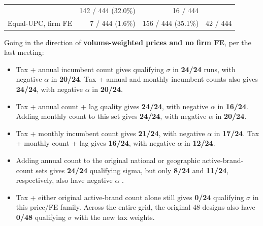 \documentclass[10pt,]{article}
\providecommand{\tightlist}{%
  \setlength{\itemsep}{0pt}\setlength{\parskip}{0pt}}
\begin{document}
\begin{longtable}[]{@{}lrrr@{}}
\begin{minipage}[t]{0.20\columnwidth}
\end{minipage} & \begin{minipage}[t]{0.20\columnwidth}\raggedleft\strut
142 / 444 (32.0\%)\strut
\end{minipage} & \begin{minipage}[t]{0.20\columnwidth}\raggedleft\strut
16 / 444\strut
\end{minipage}\tabularnewline
\begin{minipage}[t]{0.27\columnwidth}\raggedright\strut
Equal-UPC, firm FE\strut
\end{minipage} & \begin{minipage}[t]{0.20\columnwidth}\raggedleft\strut
7 / 444 (1.6\%)\strut
\end{minipage} & \begin{minipage}[t]{0.20\columnwidth}\raggedleft\strut
156 / 444 (35.1\%)\strut
\end{minipage} & \begin{minipage}[t]{0.20\columnwidth}\raggedleft\strut
42 / 444\strut
\end{minipage}\tabularnewline
\bottomrule
\end{longtable}

Going in the direction of \textbf{volume-weighted prices and no firm
FE}, per the last meeting:

\begin{itemize}
\tightlist
\item
  Tax + annual incumbent count gives qualifying \(\sigma\) in
  \textbf{24/24} runs, with negative \(\alpha\) in \textbf{20/24}. Tax +
  annual and monthly incumbent counts also gives \textbf{24/24}, with
  negative \(\alpha\) in \textbf{20/24}.
\item
  Tax + annual count + lag quality gives \textbf{24/24}, with negative
  \(\alpha\) in \textbf{16/24}. Adding monthly count to this set gives
  \textbf{24/24}, with negative \(\alpha\) in \textbf{20/24}.
\item
  Tax + monthly incumbent count gives \textbf{21/24}, with negative
  \(\alpha\) in \textbf{17/24}. Tax + monthly count + lag gives
  \textbf{16/24}, with negative \(\alpha\) in \textbf{12/24}.
\item
  Adding annual count to the original national or geographic
  active-brand-count sets gives \textbf{24/24} qualifying sigma, but
  only \textbf{8/24} and \textbf{11/24}, respectively, also have
  negative \(\alpha\) .
\item
  Tax + either original active-brand count alone still gives
  \textbf{0/24} qualifying \(\sigma\) in this price/FE family. Across
  the entire grid, the original 48 designs also have \textbf{0/48}
  qualifying \(\sigma\) with the new tax weights.
\end{itemize}
\end{document}
